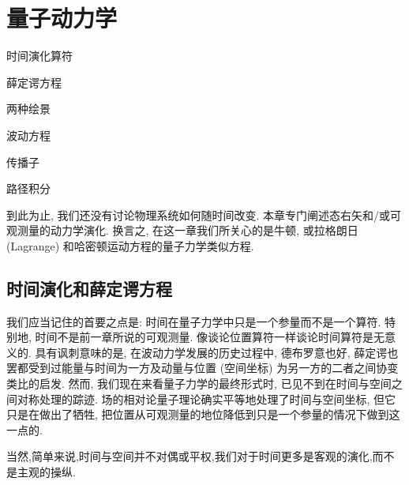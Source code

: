 \ifx\allfiles\undefined



	\else
	\fi
\chapter{量子动力学}
\begin{introduction}
	\item 时间演化算符
	\item 薛定谔方程
	\item 两种绘景
	\item 波动方程
	\item 传播子
	\item 路径积分
\end{introduction}
到此为止, 我们还没有讨论物理系统如何随时间改变. 本章专门阐述态右矢和/或可观测量的动力学演化. 换言之, 在这一章我们所关心的是牛顿, 或拉格朗日 (Lagrange) 和哈密顿运动方程的量子力学类似方程.

\section{时间演化和薛定谔方程}
我们应当记住的首要之点是: 时间在量子力学中只是一个参量而不是一个算符. 特别地, 时间不是前一章所说的可观测量. 像谈论位置算符一样谈论时间算符是无意义的. 具有讽刺意味的是, 在波动力学发展的历史过程中, 德布罗意也好, 薛定谔也罢都受到过能量与时间为一方及动量与位置 (空间坐标) 为另一方的二者之间协变类比的启发. 然而, 我们现在来看量子力学的最终形式时, 已见不到在时间与空间之间对称处理的踪迹. 场的相对论量子理论确实平等地处理了时间与空间坐标, 但它只是在做出了牺牲, 把位置从可观测量的地位降低到只是一个参量的情况下做到这一点的.

当然,简单来说,时间与空间并不对偶或平权,我们对于时间更多是客观的演化,而不是主观的操纵.
